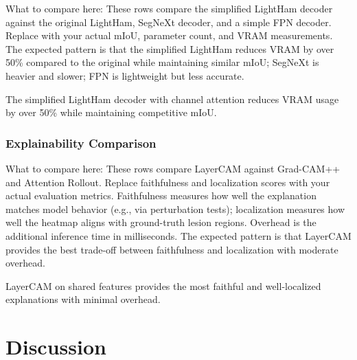 \documentclass[10pt,a4paper,twocolumn]{article}
\begin{document}
What to compare here: These rows compare the simplified LightHam decoder against the original LightHam, SegNeXt decoder, and a simple FPN decoder. Replace with your actual mIoU, parameter count, and VRAM measurements. The expected pattern is that the simplified LightHam reduces VRAM by over 50\% compared to the original while maintaining similar mIoU; SegNeXt is heavier and slower; FPN is lightweight but less accurate.

The simplified LightHam decoder with channel attention reduces VRAM usage by over 50\% while maintaining competitive mIoU.

\subsubsection{Explainability Comparison}

\begin{table}[htbp]
\centering
\caption{Explainability method comparison}
\label{tab:ablation_xai}
\end{table}

What to compare here: These rows compare LayerCAM against Grad-CAM++ and Attention Rollout. Replace faithfulness and localization scores with your actual evaluation metrics. Faithfulness measures how well the explanation matches model behavior (e.g., via perturbation tests); localization measures how well the heatmap aligns with ground-truth lesion regions. Overhead is the additional inference time in milliseconds. The expected pattern is that LayerCAM provides the best trade-off between faithfulness and localization with moderate overhead.

LayerCAM on shared features provides the most faithful and well-localized explanations with minimal overhead.

\section{Discussion}
\label{sec:discussion}
\end{document}
